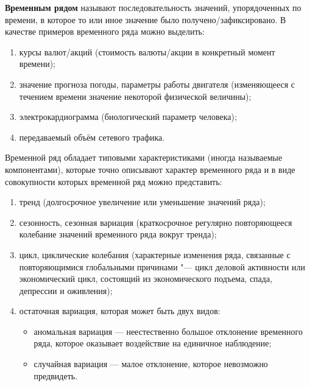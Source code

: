 \documentclass[spec, och, diploma]{SCWorks}
\begin{document}


\tableofcontents

\intro

    \textbf{Временным рядом} называют последовательность значений, упорядоченных
    по времени, в которое то или иное значение было получено/зафиксировано. В
    качестве примеров временного ряда можно выделить:

    \begin{enumerate}
        \item курсы валют/акций (стоимость валюты/акции в конкретный момент
        времени);
        \item значение прогноза погоды, параметры работы двигателя (изменяющееся
        с течением времени значение некоторой физической величины);
        \item электрокардиограмма (биологический параметр человека);
        \item передаваемый объём сетевого трафика.
    \end{enumerate}

    Временной ряд обладает типовыми характеристиками (иногда называемые
    компонентами), которые точно описывают характер временного ряда и в виде
    совокупности которых временной ряд можно представить:

    \begin{enumerate}
        \item тренд (долгосрочное увеличение или уменьшение значений ряда);
        \item сезонность, сезонная вариация (краткосрочное регулярно
        повторяющееся колебание значений временного ряда вокруг тренда);
        \item цикл, циклические колебания (характерные изменения ряда, связанные
        с повторяющимися глобальными причинами "--- цикл деловой активности или
        экономический цикл, состоящий из экономического подъема, спада,
        депрессии и оживления);
        \item остаточная вариация, которая может быть двух видов:
            \begin{itemize}
                \item аномальная вариация — неестественно большое отклонение
                временного ряда, которое оказывает воздействие на единичное
                наблюдение;
                \item случайная вариация — малое отклонение, которое невозможно
                предвидеть.
            \end{itemize}
    \end{enumerate}
\end{document}
